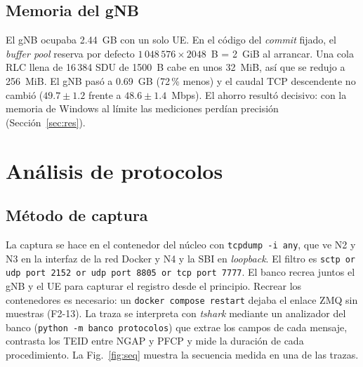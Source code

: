 \documentclass[conference]{IEEEtran}
\begin{document}
\subsection{Memoria del gNB}
El gNB ocupaba 2.44~GB con un solo UE. En el código del \textit{commit} fijado, el \textit{buffer pool} reserva por defecto $1\,048\,576\times2048$~B = 2~GiB al arrancar. Una cola RLC llena de 16\,384 SDU de 1500~B cabe en unos 32~MiB, así que se redujo a 256~MiB. El gNB pasó a 0.69~GB (72\,\% menos) y el caudal TCP descendente no cambió ($49.7\pm1.2$ frente a $48.6\pm1.4$~Mbps). El ahorro resultó decisivo: con la memoria de Windows al límite las mediciones perdían precisión (Sección~\ref{sec:res}).

\section{Análisis de protocolos}
\label{sec:proto}

\subsection{Método de captura}
La captura se hace en el contenedor del núcleo con \texttt{tcpdump -i any}, que ve N2 y N3 en la interfaz de la red Docker y N4 y la SBI en \textit{loopback}. El filtro es \texttt{sctp or udp port 2152 or udp port 8805 or tcp port 7777}. El banco recrea juntos el gNB y el UE para capturar el registro desde el principio. Recrear los contenedores es necesario: un \texttt{docker compose restart} dejaba el enlace ZMQ sin muestras (F2-13). La traza se interpreta con \textit{tshark} \cite{wireshark} mediante un analizador del banco (\texttt{python -m banco protocolos}) que extrae los campos de cada mensaje, contrasta los TEID entre NGAP y PFCP y mide la duración de cada procedimiento. La Fig.~\ref{fig:seq} muestra la secuencia medida en una de las trazas.
\end{document}
